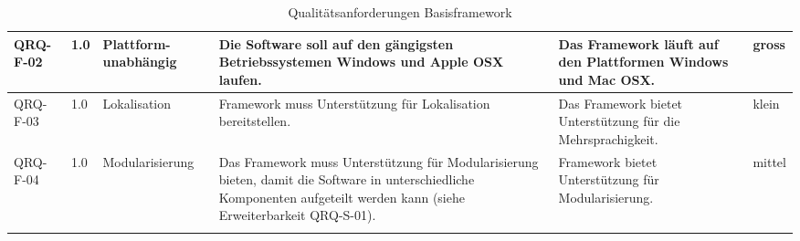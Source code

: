 \begin{landscape}
\begin{longtable}{|p{1.8cm}|p{0.7cm}|p{2.5cm}|p{7cm}|p{4cm}|p{0.9cm}|}
   QRQ-F-02 & 1.0 & Plattform-unabhängig &  Die Software soll auf den gängigsten Betriebssystemen Windows und Apple OSX laufen. & Das Framework läuft auf den Plattformen Windows und Mac OSX. & gross \\\hline

   QRQ-F-03 & 1.0 & Lokalisation & Framework muss Unterstützung für Lokalisation bereitstellen. & Das Framework bietet Unterstützung für die Mehrsprachigkeit. &klein \\\hline

   QRQ-F-04 & 1.0 & Modularisierung & Das Framework muss Unterstützung für Modularisierung bieten, damit die Software in unterschiedliche Komponenten aufgeteilt werden kann (siehe Erweiterbarkeit QRQ-S-01). & Framework bietet Unterstützung für Modularisierung.&mittel \\\hline
    \caption{Qualitätsanforderungen Basisframework}
\end{longtable}
\end{landscape}


